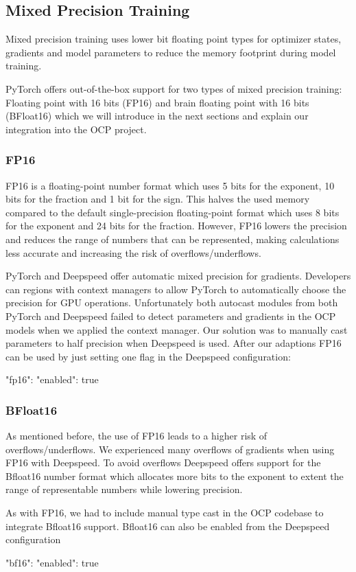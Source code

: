 \subsection{Mixed Precision Training}
\label{subsection:mixedprecision}

Mixed precision training uses lower bit floating point types for optimizer states, gradients and model parameters to 
reduce the memory footprint during model training. 

PyTorch offers out-of-the-box support for two types of mixed precision training: Floating point with 16 bits (FP16) and 
brain floating point with 16 bits (BFloat16) which we will introduce in the next sections and explain our integration 
into the OCP project.

\subsubsection{FP16}

FP16 is a floating-point number format which uses 5 bits for the exponent, 10 bits for the fraction and 1 bit for the 
sign. This halves the used memory compared to the default single-precision floating-point format which uses 8 bits 
for the exponent and 24 bits for the fraction. However, FP16 lowers the precision and reduces the range of numbers 
that can be represented, making calculations less accurate and increasing the risk of overflows/underflows.



PyTorch and Deepspeed offer automatic mixed precision for gradients. Developers can regions with context managers 
to allow PyTorch to automatically choose the precision for GPU operations. Unfortunately both autocast modules from 
both PyTorch and Deepspeed failed to detect parameters and gradients in the OCP models when we applied the context 
manager. Our solution was to manually cast parameters to half precision when Deepspeed is used. After our adaptions 
FP16 can be used by just setting one flag in the Deepspeed configuration:

\begin{json}
"fp16": {
    "enabled": true
}
\end{json}

\subsubsection{BFloat16}

As mentioned before, the use of FP16 leads to a higher risk of overflows/underflows. We experienced many overflows 
of gradients when using FP16 with Deepspeed. To avoid overflows Deepspeed offers support for the Bfloat16 number 
format which allocates more bits to the exponent to extent the range of representable numbers while lowering 
precision.



As with FP16, we had to include manual type cast in the OCP codebase to integrate Bfloat16 support. 
Bfloat16 can also be enabled from the Deepspeed configuration

\begin{json}[language=json,firstnumber=1]
"bf16": {
    "enabled": true
}
\end{json}

